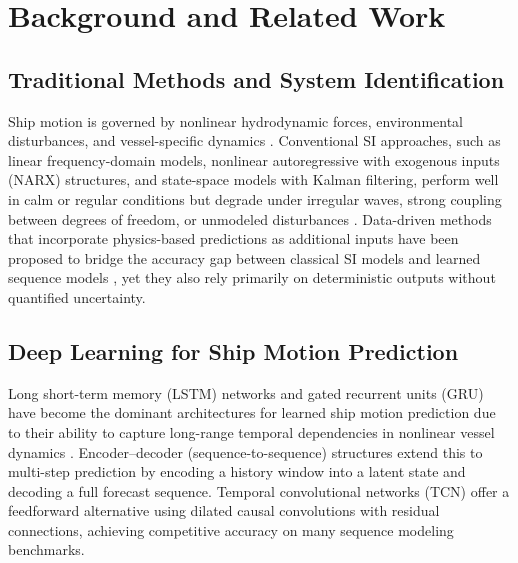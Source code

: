 \documentclass[a4paper,fleqn]{cas-sc}
\begin{document}
\section{Background and Related Work}

\subsection{Traditional Methods and System Identification}

Ship motion is governed by nonlinear hydrodynamic forces, environmental disturbances, and vessel-specific dynamics \cite{fossen2011handbook, faltinsen1990sea}. Conventional SI approaches, such as linear frequency-domain models, nonlinear autoregressive with exogenous inputs (NARX) structures, and state-space models with Kalman filtering, perform well in calm or regular conditions but degrade under irregular waves, strong coupling between degrees of freedom, or unmodeled disturbances \cite{fossen2011handbook, faltinsen1990sea, perez2007kinematic, schirmann2022datadriven}. Data-driven methods that incorporate physics-based predictions as additional inputs have been proposed to bridge the accuracy gap between classical SI models and learned sequence models \cite{schirmann2022datadriven}, yet they also rely primarily on deterministic outputs without quantified uncertainty.

\subsection{Deep Learning for Ship Motion Prediction}

Long short-term memory (LSTM) networks \cite{hochreiter1997lstm} and gated recurrent units (GRU) \cite{cho2014gru} have become the dominant architectures for learned ship motion prediction due to their ability to capture long-range temporal dependencies in nonlinear vessel dynamics \cite{lecun2015deep}. Encoder--decoder (sequence-to-sequence) structures \cite{sutskever2014seq2seq} extend this to multi-step prediction by encoding a history window into a latent state and decoding a full forecast sequence. Temporal convolutional networks (TCN) \cite{bai2018tcn} offer a feedforward alternative using dilated causal convolutions with residual connections, achieving competitive accuracy on many sequence modeling benchmarks.
\end{document}
